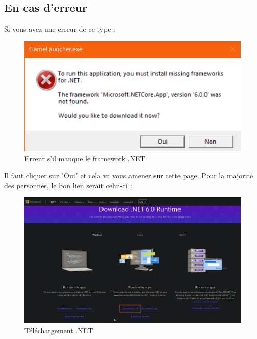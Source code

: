 \documentclass[a4paper, 10pt]{article}
\begin{document}
	\subsection{En cas d'erreur}
	Si vous avez une erreur de ce type : 
	\begin{figure}[ht]
		\centering
		\includegraphics[scale=0.5]{images/erreur.png}
		\caption{Erreur s'il manque le framework .NET}
	\end{figure}
	Il faut cliquer sur "Oui" et cela va vous amener sur \href{https://dotnet.microsoft.com/en-us/download/dotnet/6.0/runtime?cid=getdotnetcore}{cette page}.
	Pour la  majorité des personnes, le bon lien serait celui-ci : 
	\begin{figure}[ht]
		\centering
		\includegraphics[scale=0.4]{images/dotnet.png}
		\caption{Téléchargement .NET}
	\end{figure}
	
\end{document}
